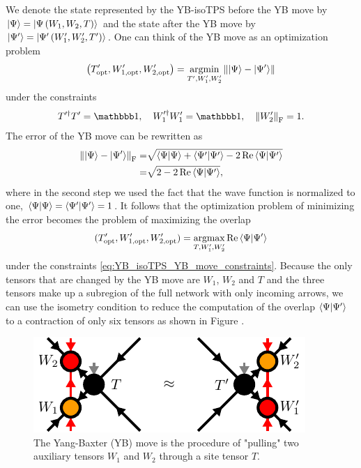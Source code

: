 We denote the state represented by the YB-isoTPS before the YB move by $\ket{\Psi} = \ket{\Psi\left(W_1, W_2, T\right)}$ and the state after the YB move by $\ket{\Psi^\prime} = \ket{\Psi^\prime\left(W_1^\prime, W_2^\prime, T^\prime\right)}$. One can think of the YB move as an optimization problem
\begin{equation}
	\label{eq:YB_isoTPS_YB_move_standard}
	\left(T^\prime_\text{opt},W_{1,\text{opt}}^\prime,W_{2,\text{opt}}^\prime\right) = \underset{T^\prime,W_1^\prime,W_2^\prime}{\operatorname{argmin}}\left\lVert \ket{\Psi} - \ket{\Psi^\prime}\right\rVert
\end{equation}
under the constraints
\begin{equation}
	\label{eq:YB_isoTPS_YB_move_constraints}
	T^{\prime\dagger}T^\prime = \id, \quad W_1^{\prime\dagger}W_1^\prime = \id, \quad \left\lVert W_2^\prime \right\rVert_\text{F} = 1.
\end{equation}
The error of the YB move can be rewritten as
\begin{equation}
	\label{eq:YB_isoTPS_YB_move_rewritten_error}
	\begin{split}
		\left\lVert \ket{\Psi} - \ket{\Psi^\prime} \right\rVert_\text{F} =& \sqrt{\braket{\Psi|\Psi} + \braket{\Psi^\prime|\Psi^\prime} - 2\operatorname{Re}\braket{\Psi|\Psi^\prime}} \\
		=& \sqrt{2 - 2\operatorname{Re}\braket{\Psi|\Psi^\prime}},
	\end{split}
\end{equation}
where in the second step we used the fact that the wave function is normalized to one, $\braket{\Psi|\Psi} = \braket{\Psi^\prime|\Psi^\prime} = 1$. It follows that the optimization problem of minimizing the error becomes the problem of maximizing the overlap
\begin{equation}
	\label{eq:YB_isoTPS_YB_move_alternative_formulation}
	(T_\text{opt}^\prime, W_{1,\text{opt}}^\prime, W_{2,\text{opt}}^\prime) = \underset{T,W_1^\prime,W_2^\prime}{\operatorname{argmax}}\operatorname{Re}\braket{\Psi|\Psi^\prime}
\end{equation}
under the constraints \eqref{eq:YB_isoTPS_YB_move_constraints}. Because the only tensors that are changed by the YB move are $W_1$, $W_2$ and $T$ and the three tensors make up a subregion of the full network with only incoming arrows, we can use the isometry condition to reduce the computation of the overlap $\braket{\Psi|\Psi^\prime}$ to a contraction of only six tensors as shown in Figure .\par
\begin{figure}
	\centering
	\includegraphics[scale=1]{figures/tikz/YB_isoTPS/yang_baxter_move/yang_baxter_move.pdf}
	\caption{The Yang-Baxter (YB) move is the procedure of "pulling" two auxiliary tensors $W_1$ and $W_2$ through a site tensor $T$.}
	\label{fig:YB_isoTPS_YB_move_closeup}
\end{figure}
